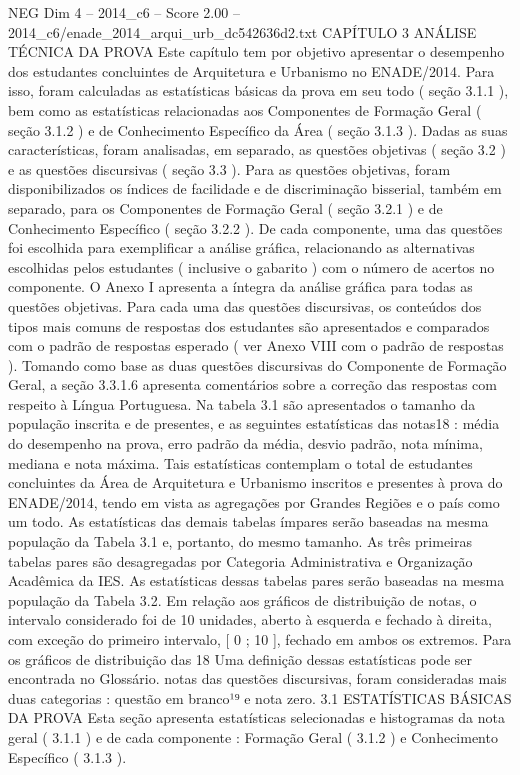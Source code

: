 \begin{textsample}{NEG Dim 4 – 2014\_c6 – Score 2.00 – 2014\_c6/enade\_2014\_arqui\_urb\_dc542636d2.txt}  \label{ex:f4_neg_283}
CAPÍTULO 3 ANÁLISE TÉCNICA DA PROVA Este capítulo tem por objetivo apresentar o desempenho dos estudantes concluintes de Arquitetura e Urbanismo no ENADE/2014.
Para isso, foram calculadas as estatísticas básicas da prova em seu todo ( seção 3.1.1 ), bem como as estatísticas relacionadas aos Componentes de Formação Geral ( seção 3.1.2 ) e de Conhecimento Específico da Área ( seção 3.1.3 ).
Dadas as suas características, foram analisadas, em separado, as questões objetivas ( seção 3.2 ) e as questões discursivas ( seção 3.3 ).
Para as questões objetivas, foram disponibilizados os índices de facilidade e de discriminação bisserial, também em separado, para os Componentes de Formação Geral ( seção 3.2.1 ) e de Conhecimento Específico ( seção 3.2.2 ).
De cada componente, uma das questões foi escolhida para exemplificar a análise gráfica, relacionando as alternativas escolhidas pelos estudantes ( inclusive o gabarito ) com o número de acertos no componente.
O Anexo I apresenta a íntegra da análise gráfica para todas as questões objetivas.
Para cada uma das questões discursivas, os conteúdos dos tipos mais comuns de respostas dos estudantes são apresentados e comparados com o padrão de respostas esperado ( ver Anexo VIII com o padrão de respostas ).
Tomando como base as duas questões discursivas do Componente de Formação Geral, a seção 3.3.1.6 apresenta comentários sobre a correção das respostas com respeito à Língua Portuguesa.
Na tabela 3.1 são apresentados o tamanho da população inscrita e de presentes, e as seguintes estatísticas das notas18 : média do desempenho na prova, erro padrão da média, desvio padrão, nota mínima, mediana e nota máxima.
Tais estatísticas contemplam o total de estudantes concluintes da Área de Arquitetura e Urbanismo inscritos e presentes à prova do ENADE/2014, tendo em vista as agregações por Grandes Regiões e o país como um todo.
As estatísticas das demais tabelas ímpares serão baseadas na mesma população da Tabela 3.1 e, portanto, do mesmo tamanho.
As três primeiras tabelas pares são desagregadas por Categoria Administrativa e Organização Acadêmica da IES.
As estatísticas dessas tabelas pares serão baseadas na mesma população da Tabela 3.2.
Em relação aos gráficos de distribuição de notas, o intervalo considerado foi de 10 unidades, aberto à esquerda e fechado à direita, com exceção do primeiro intervalo, [ 0 ; 10 ], fechado em ambos os extremos.
Para os gráficos de distribuição das 18 Uma definição dessas estatísticas pode ser encontrada no Glossário. notas das questões discursivas, foram consideradas mais duas categorias : questão em branco¹⁹ e nota zero. 3.1 ESTATÍSTICAS BÁSICAS DA PROVA Esta seção apresenta estatísticas selecionadas e histogramas da nota geral ( 3.1.1 ) e de cada componente : Formação Geral ( 3.1.2 ) e Conhecimento Específico ( 3.1.3 ).

\end{textsample}
